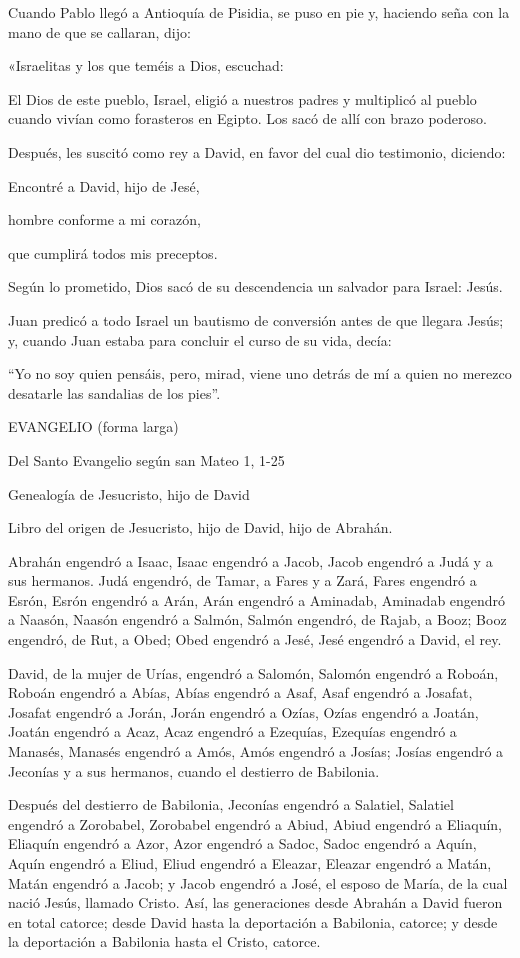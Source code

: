 \documentclass[]{article}
\begin{document}
Cuando Pablo llegó a Antioquía de Pisidia, se puso en pie y, haciendo
seña con la mano de que se callaran, dijo:

«Israelitas y los que teméis a Dios, escuchad:

El Dios de este pueblo, Israel, eligió a nuestros padres y multiplicó al
pueblo cuando vivían como forasteros en Egipto. Los sacó de allí con
brazo poderoso.

Después, les suscitó como rey a David, en favor del cual dio testimonio,
diciendo:

Encontré a David, hijo de Jesé,

hombre conforme a mi corazón,

que cumplirá todos mis preceptos.

Según lo prometido, Dios sacó de su descendencia un salvador para
Israel: Jesús.

Juan predicó a todo Israel un bautismo de conversión antes de que
llegara Jesús; y, cuando Juan estaba para concluir el curso de su vida,
decía:

``Yo no soy quien pensáis, pero, mirad, viene uno detrás de mí a quien
no merezco desatarle las sandalias de los pies''.

EVANGELIO (forma larga)

Del Santo Evangelio según san Mateo 1, 1-25

Genealogía de Jesucristo, hijo de David

Libro del origen de Jesucristo, hijo de David, hijo de Abrahán.

Abrahán engendró a Isaac, Isaac engendró a Jacob, Jacob engendró a Judá
y a sus hermanos. Judá engendró, de Tamar, a Fares y a Zará, Fares
engendró a Esrón, Esrón engendró a Arán, Arán engendró a Aminadab,
Aminadab engendró a Naasón, Naasón engendró a Salmón, Salmón engendró,
de Rajab, a Booz; Booz engendró, de Rut, a Obed; Obed engendró a Jesé,
Jesé engendró a David, el rey.

David, de la mujer de Urías, engendró a Salomón, Salomón engendró a
Roboán, Roboán engendró a Abías, Abías engendró a Asaf, Asaf engendró a
Josafat, Josafat engendró a Jorán, Jorán engendró a Ozías, Ozías
engendró a Joatán, Joatán engendró a Acaz, Acaz engendró a Ezequías,
Ezequías engendró a Manasés, Manasés engendró a Amós, Amós engendró a
Josías; Josías engendró a Jeconías y a sus hermanos, cuando el destierro
de Babilonia.

Después del destierro de Babilonia, Jeconías engendró a Salatiel,
Salatiel engendró a Zorobabel, Zorobabel engendró a Abiud, Abiud
engendró a Eliaquín, Eliaquín engendró a Azor, Azor engendró a Sadoc,
Sadoc engendró a Aquín, Aquín engendró a Eliud, Eliud engendró a
Eleazar, Eleazar engendró a Matán, Matán engendró a Jacob; y Jacob
engendró a José, el esposo de María, de la cual nació Jesús, llamado
Cristo. Así, las generaciones desde Abrahán a David fueron en total
catorce; desde David hasta la deportación a Babilonia, catorce; y desde
la deportación a Babilonia hasta el Cristo, catorce.
\end{document}
